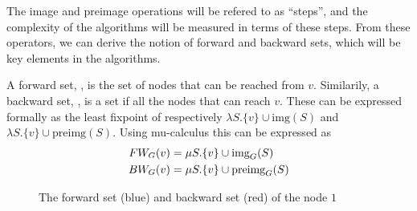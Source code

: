 \documentclass[../master/master.tex]{subfiles}
\begin{document}
The image and preimage operations will be refered to as ``steps'', and the complexity of the algorithms will be measured in terms of these steps. From these operators, we can derive the notion of forward and backward sets, which will be key elements in the algorithms.

A forward set, , is the set of nodes that can be reached from $v$. Similarily, a backward set, , is a set if all the nodes that can reach $v$. These can be expressed formally as the least fixpoint of respectively $\lambda S.\{v\}\cup \text{img}(S)$ and $\lambda S.\{v\}\cup \text{preimg}(S)$. Using mu-calculus \cite{clarke_peled_grumberg_1999} this can be expressed as 
\begin{align}\label{fw}
FW_{G}(v) &= \mu S.\{v\}\cup \text{img}_G(S)\\
\label{bw}BW_{G}(v) &= \mu S.\{v\}\cup \text{preimg}_G(S)
\end{align}

\begin{figure}[H]
\center
{}
\caption{The forward set (blue) and backward set (red) of the node $1$ }
\label{fwbw}
\end{figure}
\end{document}
